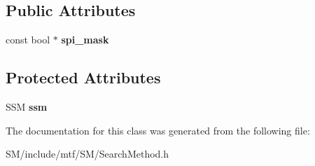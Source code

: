 \subsection*{Public Attributes}
\begin{DoxyCompactItemize}
\item 
\hypertarget{classSearchMethod_3_01void_00_01SSM_01_4_a31e3b717d7866ebbe5e63b0f75b47b0f}{const bool $\ast$ {\bfseries spi\-\_\-mask}}\label{classSearchMethod_3_01void_00_01SSM_01_4_a31e3b717d7866ebbe5e63b0f75b47b0f}

\end{DoxyCompactItemize}
\subsection*{Protected Attributes}
\begin{DoxyCompactItemize}
\item 
\hypertarget{classSearchMethod_3_01void_00_01SSM_01_4_a069af85df6823e65d35da0f41c2d9a7d}{S\-S\-M {\bfseries ssm}}\label{classSearchMethod_3_01void_00_01SSM_01_4_a069af85df6823e65d35da0f41c2d9a7d}

\end{DoxyCompactItemize}


The documentation for this class was generated from the following file\-:\begin{DoxyCompactItemize}
\item 
S\-M/include/mtf/\-S\-M/Search\-Method.\-h\end{DoxyCompactItemize}
